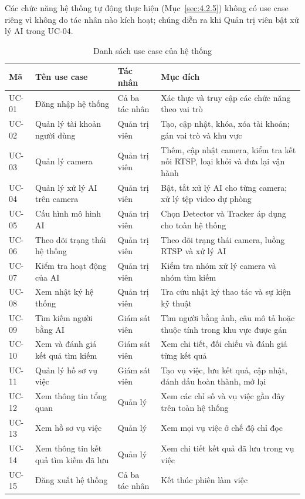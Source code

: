 Các chức năng hệ thống tự động thực hiện (Mục~\ref{sec:4.2.5}) không có use case riêng vì không do tác nhân nào kích hoạt; chúng diễn ra khi Quản trị viên bật xử lý AI trong UC-04.

\begin{table}[H]
\centering
\caption{Danh sách use case của hệ thống}
\label{tab:usecases}
\begin{tabularx}{\textwidth}{|>{\raggedright\arraybackslash}p{1.4cm}|>{\raggedright\arraybackslash}p{3.8cm}|>{\raggedright\arraybackslash}p{2.4cm}|L|}
\hline
\textbf{Mã} & \textbf{Tên use case} & \textbf{Tác nhân} & \textbf{Mục đích} \\
\hline
UC-01 & Đăng nhập hệ thống & Cả ba tác nhân & Xác thực và truy cập các chức năng theo vai trò \\
\hline
UC-02 & Quản lý tài khoản người dùng & Quản trị viên & Tạo, cập nhật, khóa, xóa tài khoản; gán vai trò và khu vực \\
\hline
UC-03 & Quản lý camera & Quản trị viên & Thêm, cập nhật camera, kiểm tra kết nối RTSP, loại khỏi và đưa lại vận hành \\
\hline
UC-04 & Quản lý xử lý AI trên camera & Quản trị viên & Bật, tắt xử lý AI cho từng camera; xử lý tệp video dự phòng \\
\hline
UC-05 & Cấu hình mô hình AI & Quản trị viên & Chọn Detector và Tracker áp dụng cho toàn hệ thống \\
\hline
UC-06 & Theo dõi trạng thái hệ thống & Quản trị viên & Theo dõi trạng thái camera, luồng RTSP và xử lý AI \\
\hline
UC-07 & Kiểm tra hoạt động của AI & Quản trị viên & Kiểm tra nhóm xử lý camera và nhóm tìm kiếm \\
\hline
UC-08 & Xem nhật ký hệ thống & Quản trị viên & Tra cứu nhật ký thao tác và sự kiện kỹ thuật \\
\hline
UC-09 & Tìm kiếm người bằng AI & Giám sát viên & Tìm người bằng ảnh, câu mô tả hoặc thuộc tính trong khu vực được gán \\
\hline
UC-10 & Xem và đánh giá kết quả tìm kiếm & Giám sát viên & Xem chi tiết, đối chiếu và đánh giá từng kết quả \\
\hline
UC-11 & Quản lý hồ sơ vụ việc & Giám sát viên & Tạo vụ việc, lưu kết quả, cập nhật, đánh dấu hoàn thành, mở lại \\
\hline
UC-12 & Xem thông tin tổng quan & Quản lý & Xem các chỉ số và vụ việc gần đây trên toàn hệ thống \\
\hline
UC-13 & Xem hồ sơ vụ việc & Quản lý & Xem mọi vụ việc ở chế độ chỉ đọc \\
\hline
UC-14 & Xem thông tin kết quả tìm kiếm đã lưu & Quản lý & Xem chi tiết kết quả đã lưu trong vụ việc \\
\hline
UC-15 & Đăng xuất hệ thống & Cả ba tác nhân & Kết thúc phiên làm việc \\
\hline
\end{tabularx}
\end{table}
